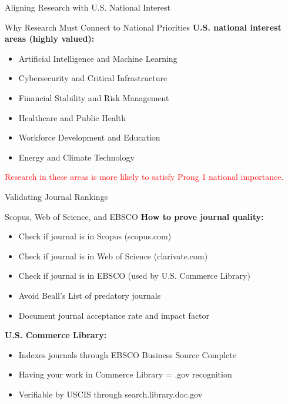 \documentclass[11pt]{beamer}
\begin{document}
	\begin{frame}{Aligning Research with U.S. National Interest}
		\scriptsize
		\begin{block}{Why Research Must Connect to National Priorities}
			\textbf{U.S. national interest areas (highly valued):}
			\begin{itemize}
				\item Artificial Intelligence and Machine Learning
				\item Cybersecurity and Critical Infrastructure
				\item Financial Stability and Risk Management
				\item Healthcare and Public Health
				\item Workforce Development and Education
				\item Energy and Climate Technology
			\end{itemize}
			\textcolor{red}{Research in these areas is more likely to satisfy Prong 1 national importance.}
		\end{block}
	\end{frame}
	
	\begin{frame}{Validating Journal Rankings}
		\scriptsize
		\begin{block}{Scopus, Web of Science, and EBSCO}
			\textbf{How to prove journal quality:}
			\begin{itemize}
				\item Check if journal is in Scopus (scopus.com)
				\item Check if journal is in Web of Science (clarivate.com)
				\item Check if journal is in EBSCO (used by U.S. Commerce Library)
				\item Avoid Beall's List of predatory journals
				\item Document journal acceptance rate and impact factor
			\end{itemize}
			\textbf{U.S. Commerce Library:}
			\begin{itemize}
				\item Indexes journals through EBSCO Business Source Complete
				\item Having your work in Commerce Library = .gov recognition
				\item Verifiable by USCIS through search.library.doc.gov
			\end{itemize}
		\end{block}
	\end{frame}
	
\end{document}
